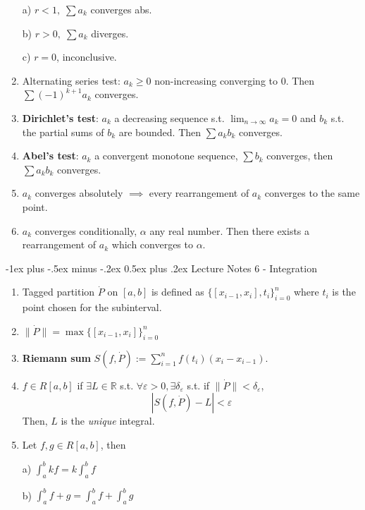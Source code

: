 \documentclass[10pt,landscape]{article}
\makeatletter
\renewcommand{\section}{\@startsection{section}{1}{0mm}%
                                {-1ex plus -.5ex minus -.2ex}%
                                {0.5ex plus .2ex}%
                                {\normalfont\large\bfseries}}
\makeatother
\begin{document}
\begin{multicols}{3}
\begin{enumerate}
	a) $r<1, \; \sum a_k$ converges abs.
	
	b) $r>0, \; \sum a_k$ diverges.
	
	c) $r=0$, inconclusive.  
	
	\item Alternating series test: $a_k\geq 0 $ non-increasing converging to 0. Then $\sum (-1)^{k+1} a_k$ converges. 

	
	\item \textbf{Dirichlet's test}: $a_k$ a decreasing sequence s.t. $\lim_{n\rightarrow \infty} a_k = 0$ and $b_k$ s.t. the partial sums of $b_k$ are bounded. Then $\sum a_k b_k$ converges.
	
	\item \textbf{Abel's test}: $a_k$ a convergent monotone sequence, $\sum b_k$ converges, then $\sum a_k b_k $ converges. 
	
	\item $a_k$ converges absolutely $\implies$ every rearrangement of $a_k$ converges to the same point. 
	\item $a_k$ converges conditionally, $\alpha$ any real number. Then there exists a rearrangement of $a_k$ which converges to $\alpha$.
	 
\end{enumerate}

\section{Lecture Notes 6 - Integration}

\begin{enumerate}
	\item Tagged partition $\dot{P}$ on $[a,b]$ is defined as $\{[x_{i-1}, x_i ], t_i\}^n_{i=0}$ where $t_i$ is the point chosen for the subinterval.
	\item $\|\dot{P} \| = \max \{[x_{i-1}, x_i ]\}^n_{i=0}$
	\item \textbf{Riemann sum} $S(f, \dot{P}) := \sum^n_{i=1} f(t_i)( x_i -x_{i-1})$.
	\item $f \in R[a,b]$ if $\exists L \in \mathbb{R}$ s.t. $\forall \varepsilon > 0, \exists \delta_\varepsilon$ s.t. if $\|\dot{P}\| < \delta_\varepsilon$, $$|S(f, \dot{P})- L| < \varepsilon$$
	Then, $L$ is the \textit{unique} integral. 
	\item Let $f,g \in R[a,b]$, then
	
	a) $\int^b_a kf = k \int^b_a f$
	
	b) $\int^b_a f+g = \int^b_a f + \int^b_a g $
	

\end{enumerate}
\end{multicols}
\end{document}
